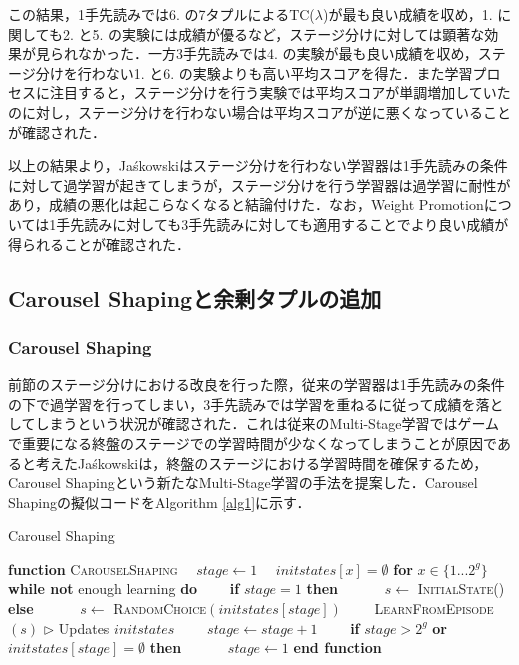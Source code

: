 \documentclass{suribt}
\begin{document}
この結果，1手先読みでは6. の7タプルによるTC(${\lambda}$)が最も良い成績を収め，1. に関しても2. と5. の実験には成績が優るなど，ステージ分けに対しては顕著な効果が見られなかった．一方3手先読みでは4. の実験が最も良い成績を収め，ステージ分けを行わない1. と6. の実験よりも高い平均スコアを得た．また学習プロセスに注目すると，ステージ分けを行う実験では平均スコアが単調増加していたのに対し，ステージ分けを行わない場合は平均スコアが逆に悪くなっていることが確認された．

以上の結果より，Ja\'{s}kowskiはステージ分けを行わない学習器は1手先読みの条件に対して過学習が起きてしまうが，ステージ分けを行う学習器は過学習に耐性があり，成績の悪化は起こらなくなると結論付けた．なお，Weight Promotionについては1手先読みに対しても3手先読みに対しても適用することでより良い成績が得られることが確認された．

\subsection{Carousel Shapingと余剰タプルの追加}
\subsubsection{Carousel Shaping}
前節のステージ分けにおける改良を行った際，従来の学習器は1手先読みの条件の下で過学習を行ってしまい，3手先読みでは学習を重ねるに従って成績を落としてしまうという状況が確認された．これは従来のMulti-Stage学習ではゲームで重要になる終盤のステージでの学習時間が少なくなってしまうことが原因であると考えたJa\'{s}kowskiは，終盤のステージにおける学習時間を確保するため，Carousel Shapingという新たなMulti-Stage学習の手法を提案した．Carousel Shapingの擬似コードをAlgorithm \ref{alg1}に示す．

\begin{algorithm}
\caption{Carousel Shaping}
\label{alg1}
\begin{algorithmic}[1]
\STATE \textbf{function} \textsc{CarouselShaping}
\STATE 　$stage \leftarrow 1$
\STATE 　$initstates[x] = \emptyset$ \textbf{for} $x \in \{1...2^g\}$
\STATE 　\textbf{while not} enough learning \textbf{do}
\STATE 　　\textbf{if} $stage = 1$ \textbf{then}
\STATE 　　　$s \leftarrow$ \textsc{InitialState()}
\STATE 　　\textbf{else}
\STATE 　　　$s \leftarrow$ \textsc{RandomChoice}$(initstates[stage])$
\STATE 　　\textsc{LearnFromEpisode}$(s)$ $\triangleright$ Updates $initstates$
\STATE 　　$stage \leftarrow stage + 1$
\STATE 　　\textbf{if} $stage > 2^g$ \textbf{or} $initstates[stage] = \emptyset$ \textbf{then}
\STATE 　　　$stage \leftarrow 1$
\STATE \textbf{end function}
\end{algorithmic}
\end{algorithm}
\end{document}
